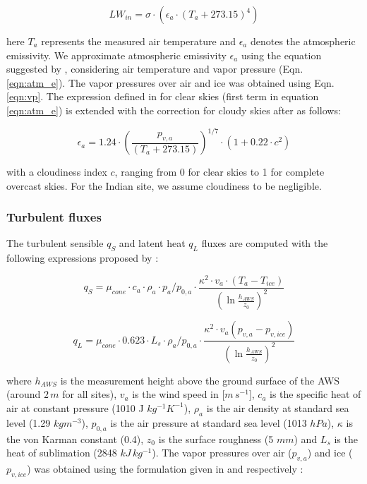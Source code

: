 \documentclass[utf8]{frontiersSCNS} %
\begin{document}
\begin{equation}
	LW_{in}=\sigma \cdot (\epsilon_a \cdot {(T_a+ 273.15)}^4)
	\label{eqn:LWin}
\end{equation}

here $T_a$ represents the measured air temperature and $\epsilon_a$ denotes the atmospheric emissivity. We approximate
atmospheric emissivity $\epsilon_a$ using the equation suggested by \cite{Brutsaert_1982}, considering air temperature
and vapor pressure (Eqn.  \ref{eqn:atm_e}). The vapor pressures over air and ice was obtained using Eqn. \ref{eqn:vp}.
The expression defined in \cite{Brutsaert_1975} for clear skies (first term in equation \ref{eqn:atm_e}) is extended
with the correction for cloudy skies after \cite{Brutsaert_1982} as follows:

\begin{equation}
	\epsilon_a=1.24 \cdot (\frac{p_{v,a}}{(T_a+273.15)})^{1/7}\cdot(1+0.22\cdot{c}^2) \label{eqn:atm_e}
\end{equation}

with a cloudiness index $c$, ranging from 0 for clear skies to 1 for complete overcast skies. For the Indian site, we
assume cloudiness to be negligible.

\subsubsection{Turbulent fluxes}

The turbulent sensible $q_{S}$ and latent heat $q_{L}$ fluxes are computed with the following expressions proposed by
\cite{Garratt_1992}:

\begin{equation}
	q_{S}=\mu_{cone}\cdot c_{a} \cdot \rho_{a} \cdot p_{a}/p_{0,a} \cdot \frac{\kappa^2 \cdot v_a \cdot
		(T_a-T_{ice})}{{(\ln{\frac{h_{AWS}}{z_{0}}})}^2}
	\label{eqn:qs}
\end{equation}

\begin{equation}
	q_{L}=\mu_{cone}\cdot 0.623 \cdot L_s \cdot \rho_{a}/p_{0,a} \cdot \frac{\kappa^2 \cdot
	v_a(p_{v,a}-p_{v,ice})}{{(\ln{\frac{h_{AWS}}{z_{0}}})}^2}
\end{equation}

where $h_{AWS}$ is the measurement height above the ground surface of the AWS (around $2\,m$ for all sites), $v_a$ is
the wind speed in [$m\,s^{-1}$], $c_a$ is the specific heat of air at constant pressure (1010 J $kg^{-1} K^{-1}$),
$\rho_{a}$ is the air density at standard sea level (1.29 $kg m^{-3}$), $p_{0,a}$ is the air pressure at standard sea
level (1013 $hPa$), $\kappa$ is the von Karman constant (0.4), $z_{0}$ is the surface roughness (5 $mm$) and $L_s$
is the heat of sublimation (2848 $kJ\,kg^{-1}$).  The vapor pressures over air ($p_{v,a}$) and ice ($p_{v,ice}$)
was obtained using the formulation given in \cite{WMO_2018} and \cite{huang_2018} respectively  :
\end{document}
